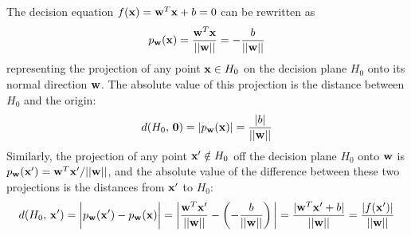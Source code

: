 \documentclass{article}
\begin{document}
The decision equation $f({\bf x})={\bf w}^T{\bf x}+b=0$ can be 
rewritten as 
\begin{equation} 
  p_{\bf w}({\bf x})=\frac{{\bf w}^T{\bf x}}{||{\bf w}||}
  =-\frac{b}{||{\bf w}||}
\end{equation}
representing the projection of any point ${\bf x}\in H_0$ on the decision
plane $H_0$ onto its normal direction ${\bf w}$. The absolute value of
this projection is the distance between $H_0$ and the origin:
\begin{equation} 
  d(H_0,\,{\bf 0})=|p_{\bf w}({\bf x})|=\frac{|b|}{||{\bf w}||}
  \label{DistToOrigin}
\end{equation}
Similarly, the projection of any point ${\bf x}'\notin H_0$ 
off the decision plane $H_0$ onto ${\bf w}$ is 
$p_{\bf w}({\bf x}')={\bf w}^T{\bf x}'/||{\bf w}||$, and the absolute 
value of the difference between these two projections is the distances
from ${\bf x}'$ to $H_0$:
\begin{equation}
  d(H_0,\,{\bf x}')=\bigg| p_{\bf w}({\bf x}')-p_{\bf w}({\bf x}) \bigg|
  =\bigg|\frac{{\bf w}^T{\bf x}'}{||{\bf w}||}-\left(-\frac{b}{||{\bf w}||}\right)\bigg|
  =\frac{|{\bf w}^T{\bf x}'+b|}{||{\bf w}||}
  =\frac{|f({\bf x}')|}{||{\bf w}||}
\end{equation}

\end{document}
